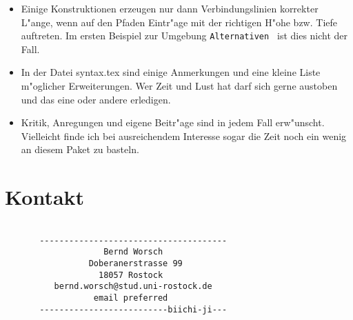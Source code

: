 \documentclass{article}
\begin{document}
\begin{itemize}
\item
Einige Konstruktionen erzeugen nur dann Verbindungslinien korrekter L"ange,
wenn auf den Pfaden Eintr"age mit der richtigen H"ohe bzw. Tiefe auftreten.
Im ersten Beispiel zur Umgebung \verb+Alternativen + ist dies nicht der Fall.
\item
In der Datei syntax.tex sind einige Anmerkungen und eine kleine Liste 
m"oglicher Erweiterungen. Wer Zeit und Lust hat darf sich gerne austoben
und das eine oder andere erledigen.
\item
Kritik, Anregungen und eigene Beitr"age sind in jedem Fall erw"unscht. 
Vielleicht finde ich bei ausreichendem Interesse sogar die Zeit noch ein 
wenig an diesem Paket zu basteln.
\end{itemize}

\section{Kontakt}

\begin{verbatim}

       --------------------------------------
                    Bernd Worsch
                 Doberanerstrasse 99 
                   18057 Rostock
          bernd.worsch@stud.uni-rostock.de
                  email preferred
       --------------------------biichi-ji---

\end{verbatim}
\end{document}
